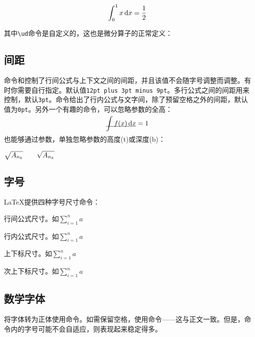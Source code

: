 \begin{codeshow}
\[ \int_0^1 x \ud{}x
= \frac{1}{2} \]
\end{codeshow}

其中\verb|\ud|命令是自定义的，这也是微分算子的正常定义\label{cmd:ud}：
\begin{latex}
\newcommand{\ud}{\mathop{}\negthinspace\mathrm{d}}
\end{latex}

\subsection{间距}
命令和控制了行间公式与上下文之间的间距，并且该值不会随字号调整而调整。有时你需要自行指定。默认值\texttt{12pt plus 3pt minus 9pt}。多行公式之间的间距用来控制，默认\texttt{3pt}。命令给出了行内公式与文字间，除了预留空格之外的间距，默认值为\texttt{0pt}。另外一个有趣的命令，可以忽略参数的全高：
\begin{codeshow}
\[\underline{\smash{\int f(x)\ud x}}=1\]
\end{codeshow}

也能够通过参数，单独忽略参数的高度(t)或深度(b)：
\begin{codeshow}
$\sqrt{A_{n_k}} \qquad
\sqrt{\smash[b]{A_{n_k}}}$
\end{codeshow}

\subsection{字号}
\LaTeX{}提供四种字号尺寸命令：
\begin{para}
\item[\latexline{displaystyle}] 行间公式尺寸。如$\displaystyle \sum_{i=1}^n a$
\item[\latexline{textstyle}] 行内公式尺寸。如$\textstyle \sum_{i=1}^n a$
\item[\latexline{scriptstyle}] 上下标尺寸。如$\scriptstyle \sum_{i=1}^n a$
\item[\latexline{scriptscriptstyle}] 次上下标尺寸。如$\scriptscriptstyle \sum_{i=1}^n a$
\end{para}

\subsection{数学字体}
将字体转为正体使用命令。如需保留空格，使用命令——这与正文一致。但是，命令内的字号可能不会自适应，则表现起来稳定得多。


